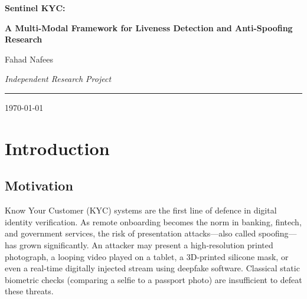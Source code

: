 \documentclass[12pt,a4paper]{report}
\begin{document}
\begin{titlepage}
    \centering
    \vspace*{2cm}
    {\huge\bfseries Sentinel KYC:\par}
    \vspace{0.5cm}
    {\Large\bfseries A Multi-Modal Framework for Liveness Detection and Anti-Spoofing Research\par}
    \vspace{2cm}
    {\Large Fahad Nafees\par}
    {\large\itshape Independent Research Project\par}
    \vspace{1cm}
    \vspace{1.5cm}
    \rule{\linewidth}{0.5pt}
    \vspace{0.5cm}
    {\large \today\par}
    \vspace{2cm}
    \begin{abstract}
    The \textbf{Sentinel KYC} system is a research-grade, multi-modal biometric liveness detection framework implemented in Python using OpenCV, MediaPipe, SciPy, and Streamlit. The system is designed to investigate the technical feasibility of detecting identity spoofing attacks in real time through a combination of geometric analysis, physiological signal extraction, frequency domain analysis, temporal pattern recognition, and 3D depth estimation. This document provides a comprehensive technical description of each modality implemented, including the specific algorithms, mathematical formulations, code logic, and experimental thresholds used in the research prototype. The system also incorporates a weighted Decision Engine that fuses all modality signals into a single confidence-scored liveness verdict.
    \end{abstract}
    \vfill
\end{titlepage}

\tableofcontents
\listoffigures
\newpage

\chapter{Introduction}

\section{Motivation}
Know Your Customer (KYC) systems are the first line of defence in digital identity verification. As remote onboarding becomes the norm in banking, fintech, and government services, the risk of presentation attacks---also called spoofing---has grown significantly. An attacker may present a high-resolution printed photograph, a looping video played on a tablet, a 3D-printed silicone mask, or even a real-time digitally injected stream using deepfake software. Classical static biometric checks (comparing a selfie to a passport photo) are insufficient to defeat these threats.
\end{document}
